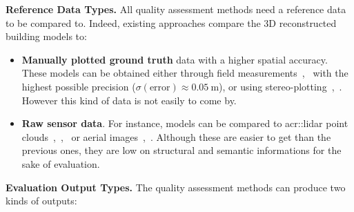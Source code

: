 \documentclass[runningheads]{llncs}
\begin{document}
\noindent
\textbf{Reference Data Types.}
All quality assessment methods need a reference data to be compared to. Indeed, existing approaches compare the 3D reconstructed building models to:
\begin{itemize}
    \item \textbf{Manually plotted ground truth} data with a higher spatial accuracy. These models can be obtained either through field measurements~\cite{Kaartinen2005},~\cite{vogtle2003quality} with the highest possible precision ($\sigma(\text{error}) \approx \SI{0.05}{\meter}$), or using stereo-plotting~\cite{Kaartinen2005},~\cite{Zeng2014}. However this kind of data is not easily to come by.
    \item \textbf{Raw sensor data}. For instance, models can be compared to \acrfull{acr::lidar} point clouds~\cite{Akca2010},~\cite{lafarge2012creating},~\cite{li2016boxfitting} or aerial images~\cite{boudet2006supervised},~\cite{Michelin2013}. Although these are easier to get than the previous ones, they are low on structural and semantic informations for the sake of evaluation.
\end{itemize}
\noindent
\textbf{Evaluation Output Types.}
The quality assessment methods can produce two kinds of outputs:
\end{document}
